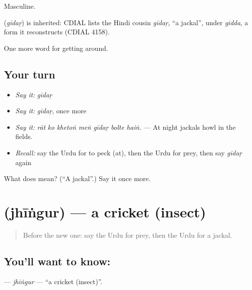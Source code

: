 Masculine.

\begin{cousinweb}
\textbf{} (\emph{gīdaṛ}) is inherited: CDIAL lists the Hindi cousin \emph{gīdaṛ}, \textquotedblleft{}a jackal\textquotedblright{}, under \emph{gidda}, a form it reconstructs (CDIAL 4158).
\end{cousinweb}

\begin{grammarlens}[title={What you've built}]
One more word for getting around.
\end{grammarlens}

\subsection*{Your turn}
\begin{itemize}
\raggedright
  \item \emph{Say it:} \emph{gīdaṛ}
  \item \emph{Say it:} \emph{gīdaṛ}, once more
  \item \emph{Say it:} \emph{rāt ko khetoṅ meṅ gīdaṛ bolte haiṅ.} — At night jackals howl in the fields.
  \item \emph{Recall:} say the Urdu for to peck (at), then the Urdu for prey, then say \emph{gīdaṛ} again
\end{itemize}

\begin{tcolorbox}[breakable,colback=teal!4,colframe=teal!35!black,title={Before you move on}]
What does  mean? (\textquotedblleft{}A jackal\textquotedblright{}.) Say it once more.
\end{tcolorbox}
\section[\texorpdfstring{\ur{جھینگر} (jhīṅgur)}{جھینگر (jhīṅgur)}]{ (jhīṅgur) — a cricket (insect)}

\label{lesson:UR-C439-jhingur}



\begin{quote}
Before the new one: say the Urdu for prey, then the Urdu for a jackal.
\end{quote}

\subsection*{You'll want to know: }
\textbf{} — \emph{jhīṅgur} — \textquotedblleft{}a cricket (insect)\textquotedblright{}.

